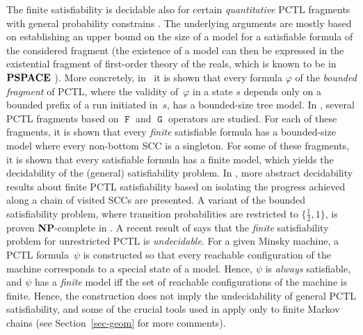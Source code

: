 \documentclass[a4paper,UKenglish,cleveref, autoref, thm-restate]{lipics-v2021}
\newcommand{\PSPACE}{\mbox{\rm\bf PSPACE}}
\newcommand{\NP}{\textbf{NP}}
\newcommand*{\opf}{\operatorname{\pmb{\mathtt{F}}}}
\newcommand*{\opg}{\operatorname{\pmb{\mathtt{G}}}}
\begin{document}
The finite satisfiability is decidable also for certain \emph{quantitative} PCTL fragments with general probability constrains \cite{KR:PCTL-unbounded,CHK:PCTL-simple,ChK:PCTL-quatitative-fragments-JCSS}. The underlying arguments are mostly based on establishing an upper bound on the size of a model for a satisfiable formula of the considered fragment (the existence of a model can then be expressed in the existential fragment of first-order theory of the reals, which is known to be in $\PSPACE$ \cite{Canny:Tarski-exist-PSPACE}).
More concretely, in~\cite{CHK:PCTL-simple} it is shown that every formula $\varphi$ of the \emph{bounded fragment} of PCTL, where the validity of~$\varphi$ in a state $s$ depends only on a bounded prefix of a run initiated in~$s$, has a bounded-size tree model. In \cite{KR:PCTL-unbounded}, several PCTL fragments based on $\opf$ and $\opg$ operators are studied. For each of these fragments, it is shown that every \emph{finite} satisfiable formula has a bounded-size model where every non-bottom SCC is a singleton. For some of these fragments, it is shown that every satisfiable formula has a finite model, which yields the decidability of the (general) satisfiability problem.  In \cite{ChK:PCTL-quatitative-fragments-JCSS}, more abstract decidability results about finite PCTL satisfiability based on isolating the progress achieved along a chain of visited SCCs are presented. A variant of the bounded satisfiability problem, where transition probabilities are restricted to $\{\frac{1}{2},1\}$, is proven \NP-complete in \cite{BFS:bounded-PCTL}. A recent result of \cite{ChK:PCTL-finite-sat-LICS} says that the \emph{finite} satisfiability problem for unrestricted PCTL is \emph{undecidable}. For a given Minsky machine, a PCTL formula~$\psi$ is constructed so that every reachable configuration of the machine corresponds to a special state of a model. Hence, $\psi$ is \emph{always} satisfiable, and $\psi$ has a \emph{finite} model iff the set of reachable configurations of the machine is finite. Hence, the construction does not imply the undecidability of general PCTL satisfiability, and some of the crucial tools used in \cite{ChK:PCTL-finite-sat-LICS} apply only to finite Markov chains (see Section~\ref{sec-geom} for more comments).
\smallskip 
\end{document}
